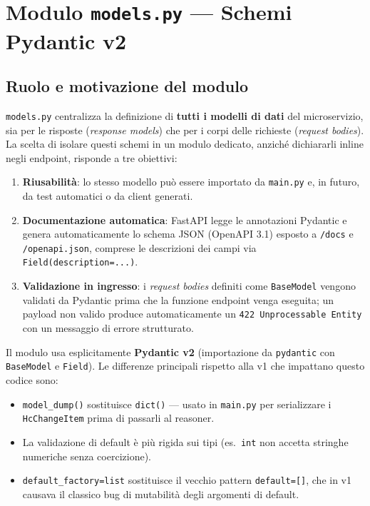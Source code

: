 \documentclass[a4paper,12pt]{article}
\begin{document}
\section{Modulo \texttt{models.py} --- Schemi Pydantic v2}

\subsection{Ruolo e motivazione del modulo}

\texttt{models.py} centralizza la definizione di \textbf{tutti i modelli
di dati} del microservizio, sia per le risposte (\textit{response models})
che per i corpi delle richieste (\textit{request bodies}). La scelta di
isolare questi schemi in un modulo dedicato, anzich\'{e} dichiararli inline
negli endpoint, risponde a tre obiettivi:

\begin{enumerate}
  \item \textbf{Riusabilit\`{a}}: lo stesso modello pu\`{o} essere importato
        da \texttt{main.py} e, in futuro, da test automatici o da client
        generati.
  \item \textbf{Documentazione automatica}: FastAPI legge le annotazioni
        Pydantic e genera automaticamente lo schema JSON (OpenAPI 3.1)
        esposto a \texttt{/docs} e \texttt{/openapi.json}, comprese le
        descrizioni dei campi via \texttt{Field(description=...)}.
  \item \textbf{Validazione in ingresso}: i \textit{request bodies}
        definiti come \texttt{BaseModel} vengono validati da Pydantic
        prima che la funzione endpoint venga eseguita; un payload non
        valido produce automaticamente un \texttt{422 Unprocessable Entity}
        con un messaggio di errore strutturato.
\end{enumerate}

\begin{infobox}[Pydantic v2 vs. v1]
Il modulo usa esplicitamente \textbf{Pydantic v2} (importazione da
\texttt{pydantic} con \texttt{BaseModel} e \texttt{Field}). Le differenze
principali rispetto alla v1 che impattano questo codice sono:
\begin{itemize}[noitemsep]
  \item \texttt{model\_dump()} sostituisce \texttt{dict()} --- usato in
        \texttt{main.py} per serializzare i \texttt{HcChangeItem} prima
        di passarli al reasoner.
  \item La validazione di default \`{e} pi\`{u} rigida sui tipi (es.\
        \texttt{int} non accetta stringhe numeriche senza coercizione).
  \item \texttt{default\_factory=list} sostituisce il vecchio pattern
        \texttt{default=[]}, che in v1 causava il classico bug di
        mutabilit\`{a} degli argomenti di default.
\end{itemize}
\end{infobox}
\end{document}
